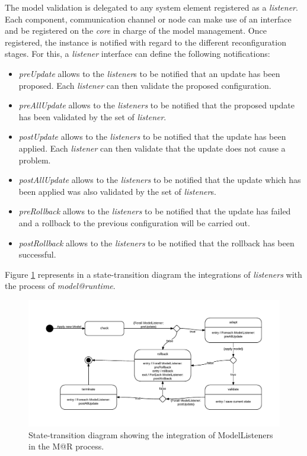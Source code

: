 The model validation is delegated to any system element registered as a \textit{listener}.
Each component, communication channel or node can make use of an interface and be registered on the \textit{core} in charge of the model management.
Once registered, the instance is notified with regard to the different reconfiguration stages.
For this, a \textit{listener} interface can define the following notifications:
\begin{itemize}
	\item \emph{preUpdate} allows to the \emph{listener}s to be notified that an update has been proposed.
	Each \emph{listener} can then validate the proposed configuration.
	\item \emph{preAllUpdate} allows to the \emph{listeners} to be notified that the proposed update has been validated by the set of \emph{listener}.
	\item \emph{postUpdate} allows to the \emph{listeners} to be notified that the update has been applied.
	Each \emph{listener} can then validate that the update does not cause a problem.
	\item \emph{postAllUpdate} allows to the \emph{listeners} to be notified that the update which has been applied was also validated by the set of \emph{listener}s.
	\item \emph{preRollback} allows to the \emph{listeners} to be notified that the update has failed and a rollback to the previous configuration will be carried out.
	\item \emph{postRollback} allows to the \emph{listeners} to be notified that the rollback has been successful.
\end{itemize}
Figure \ref{fig:MAR_modelListener} represents in a state-transition diagram the integrations of \textit{listeners} with the process of \textit{model@runtime}.

\begin{figure}[]
	\centering
	\includegraphics[width=1\columnwidth]{chapters/modelsAtRuntimeContiki.images/ModelListenerStateChart.pdf}
	\caption{State-transition diagram showing the integration of ModelListeners in the M@R process.}
	\label{fig:MAR_modelListener}
\end{figure}

